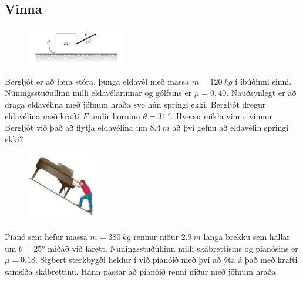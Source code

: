 \ifdefined \wholebook \else\documentclass[oneside]{book}\usepackage{EdlBook}\graphicspath{{figures/}}
\begin{document}
\begin{enumerate}[label = \textbf{Dæmi \thechapter.\arabic*.}]


\subsection*{Vinna}

\begin{minipage}{\linewidth}
\begin{figure}
\vspace{-0.5cm}
\includegraphics[width=1.7in]{images/beggatwerk.png}
\end{figure}
    
    \item Bergljót er að færa stóra, þunga eldavél með massa $m = \SI{120}{kg}$ í íbúðinni sinni. Núningsstuðullinn milli eldavélarinnar og gólfsins er $\mu = 0,40$. Nauðsynlegt er að draga eldavélina með jöfnum hraða svo hún springi ekki. Bergljót dregur eldavélina með krafti $F$ undir horninu $\theta = \SI{31}{\degree}$. Hversu mikla vinnu vinnur Bergljót við það að flytja eldavélina um $\SI{8,4}{m}$ að því gefnu að eldavélin springi ekki?
    
\end{minipage}
    
\begin{minipage}{\linewidth}
\begin{figure}
\includegraphics[width=1.2in]{images/pianoman.png}
\end{figure}
    
    \item Píanó sem hefur massa $m = \SI{380}{kg}$ rennur  niður $\SI{2.9}{m}$ langa brekku sem hallar um $\theta = \ang{25}$ miðað við lárétt. Núningsstuðullinn milli skábrettisins og píanósins er $\mu = 0.18$. Sigbert sterkbygði heldur í við píanóið með því að ýta á það með krafti samsíða skábrettinu. Hann passar að píanóið renni niður með jöfnum hraða.
    

\end{minipage}
\end{enumerate}
\end{document}
